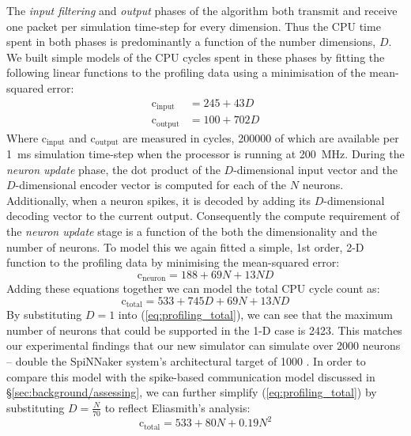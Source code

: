 \documentclass[conference]{IEEEtran}
\begin{document}
The \textit{input filtering} and \textit{output} phases of the algorithm both transmit and receive one packet per simulation time-step for every dimension.
Thus the CPU time spent in both phases is predominantly a function of the number dimensions, $D$.
We built simple models of the CPU cycles spent in these phases by fitting the following linear functions to the profiling data using a minimisation of the mean-squared error:
%
\begin{align}
  \mathrm{c}_\mathrm{input} & = 245 + 43 D \label{eq:profiling_input}\\
  \mathrm{c}_\mathrm{output} & = 100 + 702 D \label{eq:profiling_output}
\end{align}
%
Where $\mathrm{c}_\mathrm{input}$ and $\mathrm{c}_\mathrm{output}$ are measured in cycles, \num{200000} of which are available per \SI{1}{\milli\second} simulation time-step when the processor is running at \SI{200}{\mega\hertz}.
During the \textit{neuron update} phase, the dot product of the $D$-dimensional input vector and the $D$-dimensional encoder vector is computed for each of the $N$ neurons.
Additionally, when a neuron spikes, it is decoded by adding its $D$-dimensional decoding vector to the current output.
Consequently the compute requirement of the \textit{neuron update} stage is a function of the both the dimensionality and the number of neurons.
To model this we again fitted a simple, 1st order, 2-D function to the profiling data by minimising the mean-squared error:
%
\begin{equation}
  \mathrm{c}_\mathrm{neuron} = 188 + 69 N + 13 N D\label{eq:profiling_neuron}
\end{equation}
%
Adding these equations together we can model the total CPU cycle count as:
%
\begin{equation}
  \mathrm{c}_\mathrm{total} = 533 + 745 D + 69 N + 13 N D\label{eq:profiling_total}
\end{equation}
%
By substituting $D=1$ into (\ref{eq:profiling_total}), we can see that the maximum number of neurons that could be supported in the 1-D case is 2423. This matches our experimental findings that our new simulator can simulate over 2000 neurons -- double the SpiNNaker system's architectural target of 1000 \parencite{Furber2007}. 
In order to compare this model with the spike-based communication model discussed in \S\ref{sec:background/assessing}, we can further simplify (\ref{eq:profiling_total}) by substituting $D=\frac{N}{70}$ to reflect Eliasmith's \parencite{eliasmith2013build} analysis:
%
\begin{equation}
  \mathrm{c}_\mathrm{total} = 533 + 80 N + 0.19 N^{2}\label{eq:profiling_total_eliasmith}
\end{equation}
\end{document}

